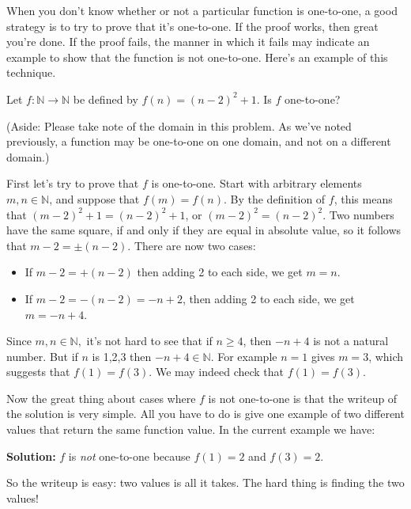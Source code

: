When you don't know whether or not a particular function is one-to-one, a good strategy is to try to prove that it's one-to-one.  If the proof works, then great you're done.  If the proof fails, the manner in which it fails may indicate an example to show that the function is not one-to-one.  Here's an example of this technique.

\begin{example}{}
Let $f\colon \mathbb{N} \to \mathbb{N}$ be defined by $f(n)=(n-2)^2 + 1$.  Is $f$ one-to-one?

\noindent(Aside: Please take note of the domain in this problem. As we've noted previously,  a function may be one-to-one on one domain, and not on a different domain.)

First let's try to prove that $f$ is one-to-one.   
Start with arbitrary elements $m, n \in \mathbb{N}$, and suppose that $f(m)=f(n)$.  By the definition of $f$, this means that $(m-2)^2 + 1=(n-2)^2 + 1$, or $(m-2)^2 =(n-2)^2 $.  Two numbers have the same square, if and only if they are equal in absolute value, so it follows that $m-2 = \pm (n-2)$.  There are now two cases:
\begin{itemize}
\item
If $m-2=+(n-2)$ then adding 2 to each side, we get $m=n$.  
\item
If $m-2 = -(n-2) = -n+2$, then adding 2 to each side, we get $m=-n+4$.  
\end{itemize}
Since $m,n \in \mathbb{N},$ it's not hard to see that if $n \ge 4$, then $-n+4$ is not a natural number.  But if $n$ is 1,2,3 then $-n+4 \in \mathbb{N}$. For example $n=1$ gives $m = 3$, which suggests that $f(1) = f(3)$. We may indeed check that  $f(1) = f(3)$. 

Now the great thing about cases where $f$ is not one-to-one is that  the writeup of the solution is very simple. All you have to do is give one example of two different values that return the same function value. In the current example we have: 
\medskip

{\bf Solution:} $f$ is \emph{not} one-to-one because $f(1) = 2$ and $f(3) = 2$. 
\medskip

\noindent  
So the writeup is easy: two values is all it takes. The hard thing is finding the two values!
\end{example}


